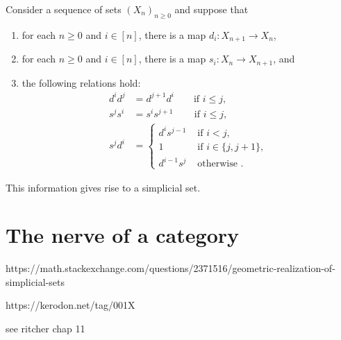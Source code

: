 \begin{theorem}
    Consider a sequence of sets  \((X_n)_{n\geq 0}\) and suppose that  
    \begin{enumerate}[label=(\roman*)]
        \item for each \(n\geq 0\) and  \(i\in [n]\), there is a map \(d_i\colon X_{n+1}\to X_n\), 
        \item for each \(n\geq 0\) and  \(i\in [n]\), there is a map \(s_i\colon X_{n}\to X_{n+1}\), and
        \item the following relations hold:
        \begin{align*}
            d^id^j &= d^{j+1} d^i       \qquad\text{if } i\leq j,\\
            s^{j}s^i &= s^i s^{j+1}     \qquad\,\text{if } i\leq j,\\
            s^jd^i &= \begin{cases}
                d^i s^{j-1} &\text{ if } i <j, \\
                1 & \text{ if } i\in \{j,j+1\}, \\
                d^{i-1} s^j & \text{ otherwise }.
            \end{cases}
        \end{align*}
    \end{enumerate}
    This information gives rise to a simplicial set.
\end{theorem}

\section{The nerve of a category}

https://math.stackexchange.com/questions/2371516/geometric-realization-of-simplicial-sets

https://kerodon.net/tag/001X

see ritcher chap 11


